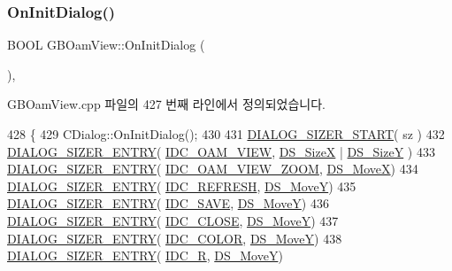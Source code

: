 \subsubsection{\texorpdfstring{On\+Init\+Dialog()}{OnInitDialog()}}
{\footnotesize\ttfamily B\+O\+OL G\+B\+Oam\+View\+::\+On\+Init\+Dialog (\begin{DoxyParamCaption}{ }\end{DoxyParamCaption})\hspace{0.3cm}{\ttfamily [protected]}, {\ttfamily [virtual]}}



G\+B\+Oam\+View.\+cpp 파일의 427 번째 라인에서 정의되었습니다.


\begin{DoxyCode}
428 \{
429   CDialog::OnInitDialog();
430   
431   \mbox{\hyperlink{_resize_dlg_8h_acb9d1d22d9838f6dda8a61cfa132997c}{DIALOG\_SIZER\_START}}( sz )
432     \mbox{\hyperlink{_resize_dlg_8h_a0e9ee7a18c54003893895a009f5d79c8}{DIALOG\_SIZER\_ENTRY}}( \mbox{\hyperlink{resource_8h_a9b64c0912aa96e257bf909982c83e5ab}{IDC\_OAM\_VIEW}}, \mbox{\hyperlink{_resize_dlg_8h_a21713fd373c62604a1ee3d5d831101ad}{DS\_SizeX}} | 
      \mbox{\hyperlink{_resize_dlg_8h_a783821ba6bb984916d55f46cdf90cb2b}{DS\_SizeY}} )
433     \mbox{\hyperlink{_resize_dlg_8h_a0e9ee7a18c54003893895a009f5d79c8}{DIALOG\_SIZER\_ENTRY}}( \mbox{\hyperlink{resource_8h_a7e646a067717f74b563429c8b81c7df2}{IDC\_OAM\_VIEW\_ZOOM}}, 
      \mbox{\hyperlink{_resize_dlg_8h_a9f96d817606755d91347bd606825c5af}{DS\_MoveX}})
434     \mbox{\hyperlink{_resize_dlg_8h_a0e9ee7a18c54003893895a009f5d79c8}{DIALOG\_SIZER\_ENTRY}}( \mbox{\hyperlink{resource_8h_ab2f366ad34063a7be9de1e2249dc705a}{IDC\_REFRESH}}, \mbox{\hyperlink{_resize_dlg_8h_ae5309071be822a4dae5cb33a131f6180}{DS\_MoveY}})
435     \mbox{\hyperlink{_resize_dlg_8h_a0e9ee7a18c54003893895a009f5d79c8}{DIALOG\_SIZER\_ENTRY}}( \mbox{\hyperlink{resource_8h_a305f8d6fb810f32b99a97396ac92f9d5}{IDC\_SAVE}},  \mbox{\hyperlink{_resize_dlg_8h_ae5309071be822a4dae5cb33a131f6180}{DS\_MoveY}})
436     \mbox{\hyperlink{_resize_dlg_8h_a0e9ee7a18c54003893895a009f5d79c8}{DIALOG\_SIZER\_ENTRY}}( \mbox{\hyperlink{resource_8h_a27e7224faecfa4040c695a69107088f9}{IDC\_CLOSE}}, \mbox{\hyperlink{_resize_dlg_8h_ae5309071be822a4dae5cb33a131f6180}{DS\_MoveY}})
437     \mbox{\hyperlink{_resize_dlg_8h_a0e9ee7a18c54003893895a009f5d79c8}{DIALOG\_SIZER\_ENTRY}}( \mbox{\hyperlink{resource_8h_a611975b03b6d7ce68b2de260b97086d0}{IDC\_COLOR}}, \mbox{\hyperlink{_resize_dlg_8h_ae5309071be822a4dae5cb33a131f6180}{DS\_MoveY}})
438     \mbox{\hyperlink{_resize_dlg_8h_a0e9ee7a18c54003893895a009f5d79c8}{DIALOG\_SIZER\_ENTRY}}( \mbox{\hyperlink{resource_8h_ab801af70383175ec71fd14d356bf9c9d}{IDC\_R}}, \mbox{\hyperlink{_resize_dlg_8h_ae5309071be822a4dae5cb33a131f6180}{DS\_MoveY}})

\end{DoxyCode}
